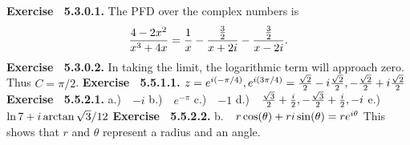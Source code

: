  {\noindent \protect \bf  Exercise ~5.3.0.1.} The PFD over the complex numbers is $$\protect \frac  {4-2x^2}{x^3+4x}=\protect \frac  {1}{x}-\protect \frac  {\protect \frac  {3}{2}}{x+2i}-\protect \frac  {\protect \frac  {3}{2}}{x-2i}. $$ \protect \newline  \protect \newline  
 {\noindent \protect \bf  Exercise ~5.3.0.2.} In taking the limit, the logarithmic term will approach zero. Thus $C=\pi /2$. \protect \newline  \protect \newline  
 {\noindent \protect \bf  Exercise ~5.5.1.1.} $z=e^{i (-\pi /4)}, e^{i(3 \pi /4)} = \protect \frac  {\protect \sqrt  {2}}{2} - i \protect \frac  {\protect \sqrt  {2}}{2},-\protect \frac  {\protect \sqrt  {2}}{2} + i \protect \frac  {\protect \sqrt  {2}}{2}$  \protect \newline  \protect \newline  
 {\noindent \protect \bf  Exercise ~5.5.2.1.} a.)~~$-i$ \protect \newline  b.)~~$e^{-\pi }$ \protect \newline  c.)~~$-1$ \protect \newline  d.)~~$\protect \frac  {\protect \sqrt  {3}}{2} + \protect \frac  {i}{2}, -\protect \frac  {\protect \sqrt  {3}}{2} + \protect \frac  {i}{2}, -i$ \protect \newline  e.)~~$\protect \qopname  \relax o{ln}{7} + i \protect \qopname  \relax o{arctan}{\protect \sqrt  {3}/12}$  \protect \newline  \protect \newline  
 {\noindent \protect \bf  Exercise ~5.5.2.2.} b.~~$r\protect \qopname  \relax o{cos}(\theta )+ri \protect \qopname  \relax o{sin}(\theta ) = re^{i \theta }$ This shows that $r$ and $\theta $ represent a radius and an angle.  \protect \newline  \protect \newline  
